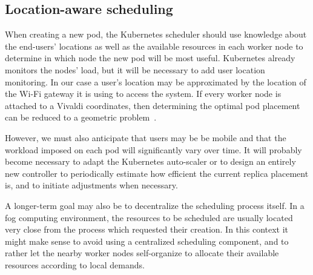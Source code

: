 \documentclass[letterpaper,twocolumn,10pt]{article}
\let\origref\ref
\def\ref#1{\textbf{\origref{#1}}}
\begin{document}


\subsection{Location-aware scheduling}

When creating a new pod, the Kubernetes scheduler should use knowledge
about the end-users' locations as well as the available resources in
each worker node to determine in which node the new pod will be most
useful. Kubernetes already monitors the nodes' load, but it will be
necessary to add user location monitoring. In our case a user's
location may be approximated by the location of the Wi-Fi gateway it
is using to access the system. If every worker node is attached to a 
Vivaldi coordinates, then determining the optimal pod placement can be
reduced to a geometric problem~\cite{szymaniak2006}.

However, we must also anticipate that users may be be mobile and that
the workload imposed on each pod will significantly vary over time. It
will probably become necessary to adapt the Kubernetes auto-scaler or
to design an entirely new controller to periodically estimate how
efficient the current replica placement is, and to initiate
adjustments when necessary.

A longer-term goal may also be to decentralize the scheduling process
itself. In a fog computing environment, the resources to be scheduled
are usually located very close from the process which requested their
creation. In this context it might make sense to avoid using a
centralized scheduling component, and to rather let the nearby worker
nodes self-organize to allocate their available resources according to
local demands.


\end{document}
